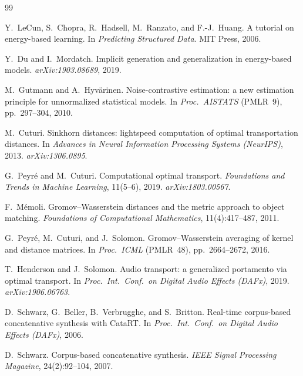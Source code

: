 \documentclass[11pt]{article}
\begin{document}
{\small
\begin{thebibliography}{99}
\setlength{\itemsep}{1pt}
\setlength{\parskip}{0pt}

Y.~LeCun, S.~Chopra, R.~Hadsell, M.~Ranzato, and F.-J.~Huang.
\newblock A tutorial on energy-based learning.
\newblock In \emph{Predicting Structured Data}. MIT Press, 2006.

Y.~Du and I.~Mordatch.
\newblock Implicit generation and generalization in energy-based models.
\newblock \emph{arXiv:1903.08689}, 2019.

M.~Gutmann and A.~Hyv\"arinen.
\newblock Noise-contrastive estimation: a new estimation principle for
  unnormalized statistical models.
\newblock In \emph{Proc.\ AISTATS} (PMLR~9), pp.~297--304, 2010.

M.~Cuturi.
\newblock Sinkhorn distances: lightspeed computation of optimal transportation
  distances.
\newblock In \emph{Advances in Neural Information Processing Systems (NeurIPS)},
  2013. \emph{arXiv:1306.0895}.

G.~Peyr\'e and M.~Cuturi.
\newblock Computational optimal transport.
\newblock \emph{Foundations and Trends in Machine Learning}, 11(5--6), 2019.
  \emph{arXiv:1803.00567}.

F.~M\'emoli.
\newblock Gromov--Wasserstein distances and the metric approach to object
  matching.
\newblock \emph{Foundations of Computational Mathematics}, 11(4):417--487, 2011.

G.~Peyr\'e, M.~Cuturi, and J.~Solomon.
\newblock Gromov--Wasserstein averaging of kernel and distance matrices.
\newblock In \emph{Proc.\ ICML} (PMLR~48), pp.~2664--2672, 2016.

T.~Henderson and J.~Solomon.
\newblock Audio transport: a generalized portamento via optimal transport.
\newblock In \emph{Proc.\ Int.\ Conf.\ on Digital Audio Effects (DAFx)}, 2019.
  \emph{arXiv:1906.06763}.

D.~Schwarz, G.~Beller, B.~Verbrugghe, and S.~Britton.
\newblock Real-time corpus-based concatenative synthesis with CataRT.
\newblock In \emph{Proc.\ Int.\ Conf.\ on Digital Audio Effects (DAFx)}, 2006.

D.~Schwarz.
\newblock Corpus-based concatenative synthesis.
\newblock \emph{IEEE Signal Processing Magazine}, 24(2):92--104, 2007.


\end{thebibliography}}
\end{document}
